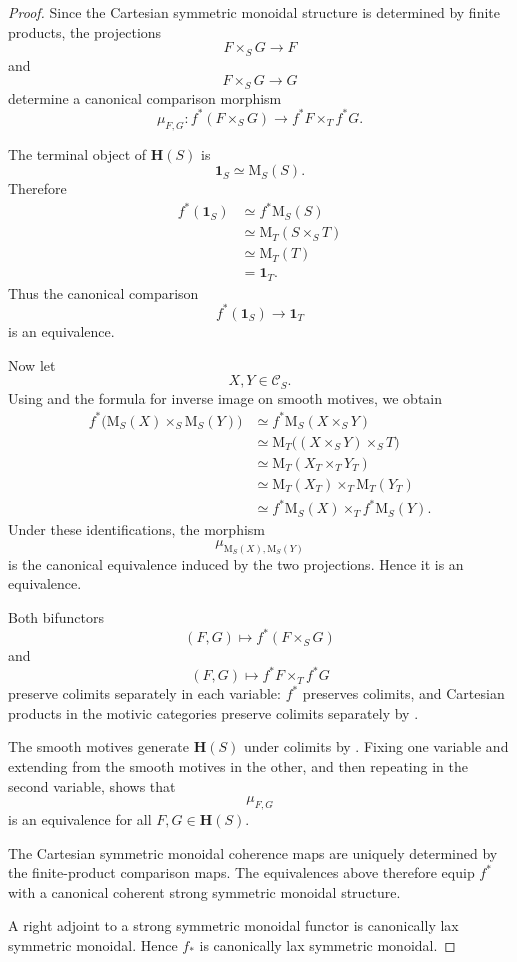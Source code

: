 \begin{proof}
Since the Cartesian symmetric monoidal structure is determined by
finite products, the projections
\[
    F\times_SG
    \longrightarrow
    F
\]
and
\[
    F\times_SG
    \longrightarrow
    G
\]
determine a canonical comparison morphism
\[
    \mu_{F,G}
    \colon
    f^*(F\times_SG)
    \longrightarrow
    f^*F\times_Tf^*G.
\]

The terminal object of \(\mathbf H(S)\) is
\[
    \mathbf 1_S
    \simeq
    \mathrm M_S(S).
\]
Therefore
\[
\begin{aligned}
    f^*(\mathbf 1_S)
    &\simeq
    f^*\mathrm M_S(S)
    \\
    &\simeq
    \mathrm M_T(S\times_ST)
    \\
    &\simeq
    \mathrm M_T(T)
    \\
    &=
    \mathbf 1_T.
\end{aligned}
\]
Thus the canonical comparison
\[
    f^*(\mathbf 1_S)
    \longrightarrow
    \mathbf 1_T
\]
is an equivalence.

Now let
\[
    X,Y
    \in
    \mathcal C_S.
\]
Using
and the formula for inverse image on smooth motives, we obtain
\[
\begin{aligned}
    f^*
    \bigl(
        \mathrm M_S(X)\times_S\mathrm M_S(Y)
    \bigr)
    &\simeq
    f^*\mathrm M_S(X\times_SY)
    \\
    &\simeq
    \mathrm M_T
    \bigl(
        (X\times_SY)\times_ST
    \bigr)
    \\
    &\simeq
    \mathrm M_T(X_T\times_TY_T)
    \\
    &\simeq
    \mathrm M_T(X_T)
    \times_T
    \mathrm M_T(Y_T)
    \\
    &\simeq
    f^*\mathrm M_S(X)
    \times_T
    f^*\mathrm M_S(Y).
\end{aligned}
\]
Under these identifications, the morphism
\[
    \mu_{\mathrm M_S(X),\mathrm M_S(Y)}
\]
is the canonical equivalence induced by the two projections. Hence it
is an equivalence.

Both bifunctors
\[
    (F,G)
    \longmapsto
    f^*(F\times_SG)
\]
and
\[
    (F,G)
    \longmapsto
    f^*F\times_Tf^*G
\]
preserve colimits separately in each variable: \(f^*\) preserves
colimits, and Cartesian products in the motivic categories preserve
colimits separately by
.

The smooth motives generate \(\mathbf H(S)\) under colimits by
. Fixing one variable
and extending from the smooth motives in the other, and then repeating
in the second variable, shows that
\[
    \mu_{F,G}
\]
is an equivalence for all \(F,G\in\mathbf H(S)\).

The Cartesian symmetric monoidal coherence maps are uniquely determined
by the finite-product comparison maps. The equivalences above therefore
equip \(f^*\) with a canonical coherent strong symmetric monoidal
structure.

A right adjoint to a strong symmetric monoidal functor is canonically
lax symmetric monoidal. Hence \(f_*\) is canonically lax symmetric
monoidal.
\end{proof}

